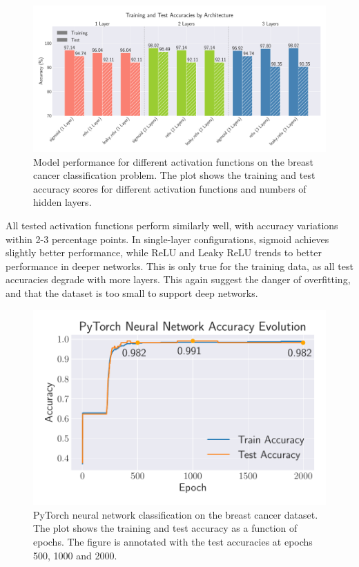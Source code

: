 \onecolumngrid
\begin{figure}[ht!]
    \centering
    \includegraphics[width = .9\textwidth]{../figs/classification_activations_layers.pdf}
    \caption{Model performance for different activation functions on the breast cancer classification problem. The plot shows the training and test accuracy scores for different activation functions and numbers of hidden layers.}
    \label{fig:NN_Classification_activations_layers}
\end{figure}
\twocolumngrid

All tested activation functions perform similarly well, with accuracy variations within 2-3 percentage points. In single-layer configurations, sigmoid achieves slightly better performance, while ReLU and Leaky ReLU trends to better performance in deeper networks. This is only true for the training data, as all test accuracies degrade with more layers. This again suggest the danger of overfitting, and that the dataset is too small to support deep networks.

\begin{figure}[ht!]
    \centering
    \includegraphics[width =.45\textwidth]{../figs/nn_torch_breast_cancer.pdf}
    \caption{PyTorch neural network classification on the breast cancer dataset. The plot shows the training and test accuracy as a function of epochs. The figure is annotated with the test accuracies at epochs 500, 1000 and 2000.}
    \label{fig:NN_Torch_breast_cancer}
\end{figure}

